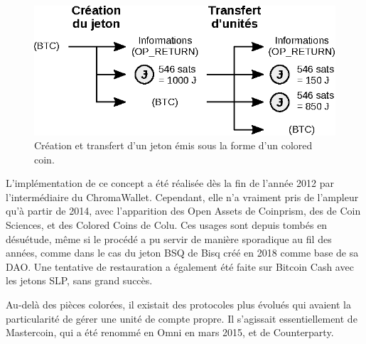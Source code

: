 \begin{figure}[h]
  \centering
  \includegraphics[scale=1]{img/colored-coin.eps}
  \caption{Création et transfert d'un jeton émis sous la forme d'un colored coin.}
  \label{fig:colored-coin}
\end{figure}

L'implémentation de ce concept a été réalisée dès la fin de l'année 2012 par l'intermédiaire du ChromaWallet. Cependant, elle n'a vraiment pris de l'ampleur qu'à partir de 2014, avec l'apparition des Open Assets de Coinprism, des  de Coin Sciences, et des Colored Coins de Colu. Ces usages sont depuis tombés en désuétude, même si le procédé a pu servir de manière sporadique au fil des années, comme dans le cas du jeton BSQ de Bisq créé en 2018 comme base de sa DAO. Une tentative de restauration a également été faite sur Bitcoin Cash avec les jetons SLP, sans grand succès. %

Au-delà des pièces colorées, il existait des protocoles plus évolués qui avaient la particularité de gérer une unité de compte propre. Il s'agissait essentiellement de Mastercoin, qui a été renommé en Omni en mars 2015, et de Counterparty.

